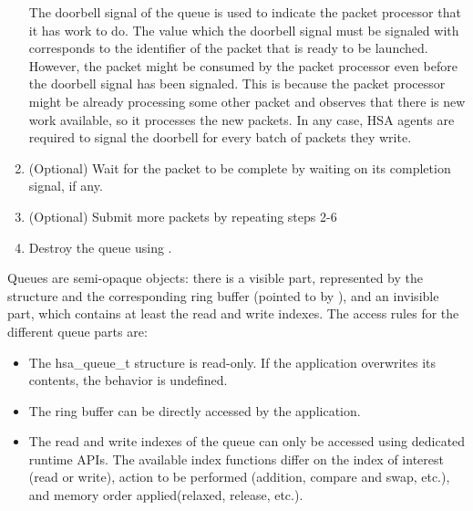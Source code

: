 \documentclass[final,oneside]{book}
\begin{document}
\begin{enumerate}[itemsep=1pt,topsep=3pt,partopsep=0pt]
  The doorbell signal of the queue is used to indicate the packet processor that
  it has work to do. The value which the doorbell signal must be signaled with
  corresponds to the identifier of the packet that is ready to be launched.
  However, the packet might be consumed by the packet processor even before the
  doorbell signal has been signaled. This is because the packet processor might
  be already processing some other packet and observes that there is new work
  available, so it processes the new packets. In any case, HSA agents are
  required to signal the doorbell for every batch of packets they write.

\item (Optional) Wait for the packet to be complete by waiting on its completion
  signal, if any.

\item (Optional) Submit more packets by repeating steps 2-6

\item Destroy the queue using .
\end{enumerate}

Queues are semi-opaque objects: there is a visible part, represented by the
 structure and the corresponding ring buffer (pointed to by
), and an invisible part, which contains at
least the read and write indexes. The access rules for the different queue parts
are:
\begin{itemize}[itemsep=1pt,topsep=3pt,partopsep=0pt]
\item The {hsa_queue_t} structure is read-only. If the application overwrites
  its contents, the behavior is undefined.
\item The ring buffer can be directly accessed by the application.
\item The read and write indexes of the queue can only be accessed using
  dedicated runtime APIs.  The available index functions differ on the index of
  interest (read or write), action to be performed (addition, compare and swap,
  etc.), and memory order applied(relaxed, release, etc.).
\end{itemize}


\end{document}
